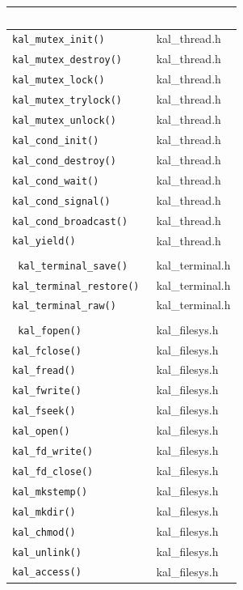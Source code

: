 \documentclass[11pt,twoside]{article}
\begin{document}
\begin{longtable}{>{\tt}l l}
\multicolumn{2}{l}{\bf Threading} \\
\hline
kal\_mutex\_init()       & kal\_thread.h \\
kal\_mutex\_destroy()    & kal\_thread.h \\
kal\_mutex\_lock()       & kal\_thread.h \\
kal\_mutex\_trylock()    & kal\_thread.h \\
kal\_mutex\_unlock()     & kal\_thread.h \\
kal\_cond\_init()        & kal\_thread.h \\
kal\_cond\_destroy()     & kal\_thread.h \\
kal\_cond\_wait()        & kal\_thread.h \\
kal\_cond\_signal()      & kal\_thread.h \\
kal\_cond\_broadcast()   & kal\_thread.h \\
kal\_yield()             & kal\_thread.h \\
\hline

\multicolumn{2}{l}{\bf Terminal} \\
\hline
kal\_terminal\_save()    & kal\_terminal.h \\
kal\_terminal\_restore() & kal\_terminal.h \\
kal\_terminal\_raw()     & kal\_terminal.h \\
\hline

\multicolumn{2}{l}{\bf Filesystem} \\
\hline
kal\_fopen()             & kal\_filesys.h \\
kal\_fclose()            & kal\_filesys.h \\
kal\_fread()             & kal\_filesys.h \\
kal\_fwrite()            & kal\_filesys.h \\
kal\_fseek()             & kal\_filesys.h \\
kal\_open()              & kal\_filesys.h \\
kal\_fd\_write()         & kal\_filesys.h \\
kal\_fd\_close()         & kal\_filesys.h \\
kal\_mkstemp()           & kal\_filesys.h \\
kal\_mkdir()             & kal\_filesys.h \\
kal\_chmod()             & kal\_filesys.h \\
kal\_unlink()            & kal\_filesys.h \\
kal\_access()            & kal\_filesys.h \\
\hline


\end{longtable}
\end{document}
